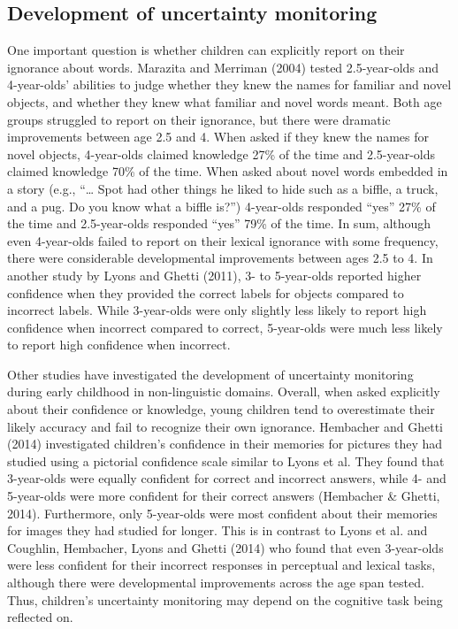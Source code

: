 \documentclass[english,,man]{apa6}
\begin{document}
\subsection{Development of uncertainty
monitoring}\label{development-of-uncertainty-monitoring}

One important question is whether children can explicitly report on
their ignorance about words. Marazita and Merriman (2004) tested
2.5-year-olds and 4-year-olds' abilities to judge whether they knew the
names for familiar and novel objects, and whether they knew what
familiar and novel words meant. Both age groups struggled to report on
their ignorance, but there were dramatic improvements between age 2.5
and 4. When asked if they knew the names for novel objects, 4-year-olds
claimed knowledge 27\% of the time and 2.5-year-olds claimed knowledge
70\% of the time. When asked about novel words embedded in a story
(e.g., \enquote{\ldots{} Spot had other things he liked to hide such as
a biffle, a truck, and a pug. Do you know what a biffle is?})
4-year-olds responded \enquote{yes} 27\% of the time and 2.5-year-olds
responded \enquote{yes} 79\% of the time. In sum, although even
4-year-olds failed to report on their lexical ignorance with some
frequency, there were considerable developmental improvements between
ages 2.5 to 4. In another study by Lyons and Ghetti (2011), 3- to
5-year-olds reported higher confidence when they provided the correct
labels for objects compared to incorrect labels. While 3-year-olds were
only slightly less likely to report high confidence when incorrect
compared to correct, 5-year-olds were much less likely to report high
confidence when incorrect.

Other studies have investigated the development of uncertainty
monitoring during early childhood in non-linguistic domains. Overall,
when asked explicitly about their confidence or knowledge, young
children tend to overestimate their likely accuracy and fail to
recognize their own ignorance. Hembacher and Ghetti (2014) investigated
children's confidence in their memories for pictures they had studied
using a pictorial confidence scale similar to Lyons et al. They found
that 3-year-olds were equally confident for correct and incorrect
answers, while 4- and 5-year-olds were more confident for their correct
answers (Hembacher \& Ghetti, 2014). Furthermore, only 5-year-olds were
most confident about their memories for images they had studied for
longer. This is in contrast to Lyons et al. and Coughlin, Hembacher,
Lyons and Ghetti (2014) who found that even 3-year-olds were less
confident for their incorrect responses in perceptual and lexical tasks,
although there were developmental improvements across the age span
tested. Thus, children's uncertainty monitoring may depend on the
cognitive task being reflected on.
\end{document}
